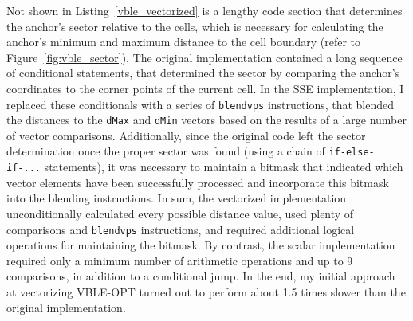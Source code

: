 Not shown in Listing~\ref{vble_vectorized} is a lengthy code section that determines the anchor's sector relative to the cells, which is necessary for calculating the anchor's minimum and maximum distance to the cell boundary (refer to Figure~\ref{fig:vble_sector}). The original implementation contained a long sequence of conditional statements, that determined the sector by comparing the anchor's coordinates to the corner points of the current cell. In the SSE implementation, I replaced these conditionals with a series of \texttt{blendvps} instructions, that blended the distances to the \texttt{dMax} and \texttt{dMin} vectors based on the results of a large number of vector comparisons. Additionally, since the original code left the sector determination once the proper sector was found (using a chain of \texttt{if-else-if-...} statements), it was necessary to maintain a bitmask that indicated which vector elements have been successfully processed and incorporate this bitmask into the blending instructions. In sum, the vectorized implementation unconditionally calculated every possible distance value, used plenty of comparisons and \texttt{blendvps} instructions, and required additional logical operations for maintaining the bitmask. By contrast, the scalar implementation required only a minimum number of arithmetic operations and up to 9 comparisons, in addition to a conditional jump. In the end, my initial approach at vectorizing VBLE-OPT turned out to perform about 1.5 times slower than the original implementation.

